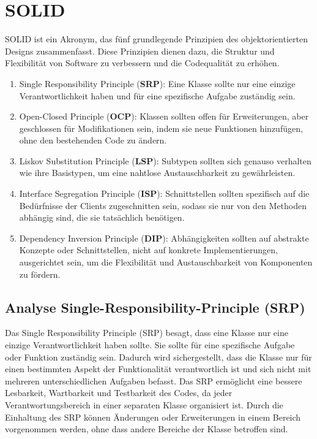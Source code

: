\chapter{SOLID}
SOLID ist ein Akronym, das fünf grundlegende Prinzipien des objektorientierten Designs zusammenfasst. Diese Prinzipien dienen dazu, die Struktur und Flexibilität von Software zu verbessern und die Codequalität zu erhöhen.
\begin{enumerate}
    \item Single Responsibility Principle (\textbf{SRP}): Eine Klasse sollte nur eine einzige Verantwortlichkeit haben und für eine spezifische Aufgabe zuständig sein.

    \item Open-Closed Principle (\textbf{OCP}): Klassen sollten offen für Erweiterungen, aber geschlossen für Modifikationen sein, indem sie neue Funktionen hinzufügen, ohne den bestehenden Code zu ändern.
    
    \item Liskov Substitution Principle (\textbf{LSP}): Subtypen sollten sich genauso verhalten wie ihre Basistypen, um eine nahtlose Austauschbarkeit zu gewährleisten.
    
    \item Interface Segregation Principle (\textbf{ISP}): Schnittstellen sollten spezifisch auf die Bedürfnisse der Clients zugeschnitten sein, sodass sie nur von den Methoden abhängig sind, die sie tatsächlich benötigen.
    
    \item Dependency Inversion Principle (\textbf{DIP}): Abhängigkeiten sollten auf abstrakte Konzepte oder Schnittstellen, nicht auf konkrete Implementierungen, ausgerichtet sein, um die Flexibilität und Austauschbarkeit von Komponenten zu fördern.
\end{enumerate}
\section{Analyse Single-Responsibility-Principle (SRP)}
Das Single Responsibility Principle (SRP) besagt, dass eine Klasse nur eine einzige Verantwortlichkeit haben sollte. Sie sollte für eine spezifische Aufgabe oder Funktion zuständig sein. Dadurch wird sichergestellt, dass die Klasse nur für einen bestimmten Aspekt der Funktionalität verantwortlich ist und sich nicht mit mehreren unterschiedlichen Aufgaben befasst. Das SRP ermöglicht eine bessere Lesbarkeit, Wartbarkeit und Testbarkeit des Codes, da jeder Verantwortungsbereich in einer separaten Klasse organisiert ist. Durch die Einhaltung des SRP können Änderungen oder Erweiterungen in einem Bereich vorgenommen werden, ohne dass andere Bereiche der Klasse betroffen sind.
